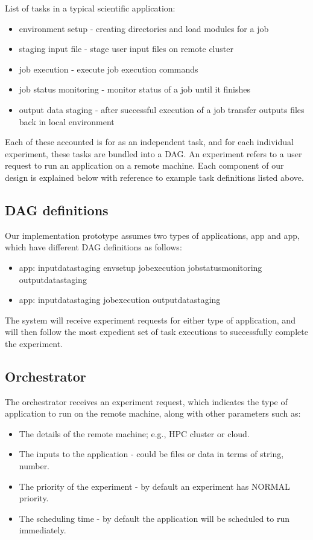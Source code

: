 \documentclass[sigconf]{acmart}
\begin{document}
List of tasks in a typical scientific application:
\begin{itemize}
\item environment setup - creating directories and load modules for a job
\item staging input file - stage user input files on remote cluster
\item job execution - execute job execution commands
\item job status monitoring - monitor status of a job until it finishes 
\item output data staging - after successful execution of a job transfer outputs files back in local environment
\end{itemize}

Each of these accounted is for as an independent task, and for each individual experiment, these tasks are bundled into a DAG. An experiment refers to a user request to run an application on a remote machine. Each component of our design is explained below with reference to example task definitions listed above.

\subsection{DAG definitions}
Our implementation prototype assumes two types of applications, app and app, which have different DAG definitions as follows:
\begin{itemize}
\item app: input\textunderscore datastaging \textrightarrow  env\textunderscore setup  \textrightarrow  job\textunderscore execution  \textrightarrow  job\textunderscore status\textunderscore monitoring  \textrightarrow  output\textunderscore datastaging
\item app: input\textunderscore datastaging  \textrightarrow  job\textunderscore execution  \textrightarrow  output\textunderscore datastaging
\end{itemize}

The system will receive experiment requests for either type of application, and will then follow the most expedient set of task executions to successfully complete the experiment.

\subsection{Orchestrator}
The orchestrator receives an experiment request, which indicates the type of application to run on the remote machine, along with other parameters such as:
\begin{itemize}
\item The details of the remote machine; e.g., HPC cluster or cloud.
\item The inputs to the application - could be files or data in terms of string, number.
\item The priority of the experiment - by default an experiment has NORMAL priority.
\item The scheduling time - by default the application will be scheduled to run immediately.
\end{itemize}
\end{document}
